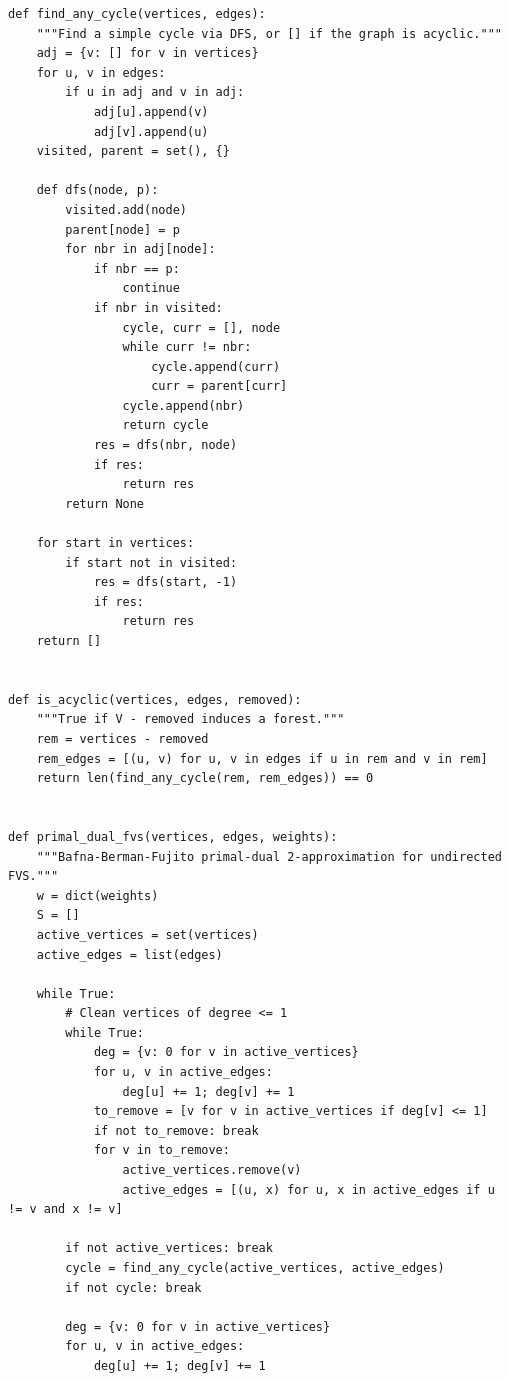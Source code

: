\begin{lstlisting}[style=python, caption=Primal-Dual Feedback Vertex Set]
def find_any_cycle(vertices, edges):
    """Find a simple cycle via DFS, or [] if the graph is acyclic."""
    adj = {v: [] for v in vertices}
    for u, v in edges:
        if u in adj and v in adj:
            adj[u].append(v)
            adj[v].append(u)
    visited, parent = set(), {}

    def dfs(node, p):
        visited.add(node)
        parent[node] = p
        for nbr in adj[node]:
            if nbr == p:
                continue
            if nbr in visited:
                cycle, curr = [], node
                while curr != nbr:
                    cycle.append(curr)
                    curr = parent[curr]
                cycle.append(nbr)
                return cycle
            res = dfs(nbr, node)
            if res:
                return res
        return None

    for start in vertices:
        if start not in visited:
            res = dfs(start, -1)
            if res:
                return res
    return []


def is_acyclic(vertices, edges, removed):
    """True if V - removed induces a forest."""
    rem = vertices - removed
    rem_edges = [(u, v) for u, v in edges if u in rem and v in rem]
    return len(find_any_cycle(rem, rem_edges)) == 0


def primal_dual_fvs(vertices, edges, weights):
    """Bafna-Berman-Fujito primal-dual 2-approximation for undirected FVS."""
    w = dict(weights)
    S = []
    active_vertices = set(vertices)
    active_edges = list(edges)
    
    while True:
        # Clean vertices of degree <= 1
        while True:
            deg = {v: 0 for v in active_vertices}
            for u, v in active_edges:
                deg[u] += 1; deg[v] += 1
            to_remove = [v for v in active_vertices if deg[v] <= 1]
            if not to_remove: break
            for v in to_remove:
                active_vertices.remove(v)
                active_edges = [(u, x) for u, x in active_edges if u != v and x != v]
                
        if not active_vertices: break
        cycle = find_any_cycle(active_vertices, active_edges)
        if not cycle: break
        
        deg = {v: 0 for v in active_vertices}
        for u, v in active_edges:
            deg[u] += 1; deg[v] += 1
            

\end{lstlisting}
